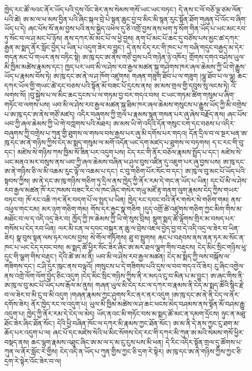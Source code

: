 \documentclass{article}
\begin{document}
ཁྱེད་རང་ཚོ་ལའང་ནོར་ཡོད་པའི་དུས་འོང་ཟེར་ནས་སེམས་གསོ་ཡང་ཡང་བཏང་། དེ་ནས་ང་ལོ་བཅོ་ལྔ་ཙམ་ལོན་པའི་ཚེ། ཨ་མ་ལ་ཕ་མས་བྱིན་པའི་ཞིང་སྐལ་བྲེ་པེ་སྟན་ཆུང་བྱ་བ་མིང་མི་སྙན་རུང་སྟོན་ཐོག་གཞུན་པོ་འོང་བ་ཞིག་ཡོད་པ་དེ། ཞང་པོས་སོ་ནམ་བྱས་པའི་ནས་སྐྱེད་འཕེལ་དུ་ཅི་འགྲོ་བྱས་ནས་ཕག་ཏུ་སོག་གིན་ཡོད་པ་ཡང་མང་རབ་ཏུ་སོང་བ་ལ་ཤ་མང་པོ་ཉོས། ནས་དཀར་མོ་མང་པོ་ལ་ཕྱེ་བྱས། ནག་པོ་མང་པོ་ཆང་དུ་བཙོས་པས་མྱང་ཚ་དཀར་རྒྱན་མ་སྨད་ནོར་སློང་བྱེད་པ་ཡིན་པ་འདུག་ཟེར་བ་བྱུང་། དེ་ནས་ངེད་རང་གི་ཁང་པ་ཀ་བཞི་གདུང་བརྒྱད་མ་དེར་གདན་མང་པོ་གཡར་ནས་བཏིང་སྟེ། ཨ་ཁུ་དང་ཨ་ནེས་གཙོ་བྱས་པའི་གཉེན་ཉེ་འཁོར། གྲོགས་དགའ་བཤེས་ཡུལ་མི་ཁྱིམ་མཚེས་རྣམས་དང་། ཁྱད་པར་ཡབ་མི་ལ་ཤེས་རབ་རྒྱལ་མཚན་སྐུ་གཤེགས་ཁར་ཞལ་ཆེམས་ཀྱི་ཡི་གེ་རྒྱུས་ཡོད་པ་རྣམས་བོས་ཏེ། ཨ་ཁུ་དང་ཨ་ནེ་ལ་ཤ་ཁོག་འཛུགས། གཞན་གཟུག་ཐོབ་པ་ལ་གཟུག །ལྷུ་ཐོབ་པ་ལ་ལྷུ། ཆང་དཀར་ཡོལ་གྱི་གཡང་ཚེ་དང་བཅས་པའི་སྟོན་མོ་བཟང་པོ་དྲངས་ནས། ཨ་མས་གྲལ་གྱི་དབུས་སུ་ལངས་ཏེ། འོ་ལགས་སོ། །བུ་སྐྱེས་པ་ལ་མིང་ཆང་དྲངས་པ་ལ་གཏམ་བྱ་བར་གདའ་བས། ང་ཡང་གཏམ་ཚིག་གསུམ་པ་ཞིག་གཏོང་བ་ལགས་པས། ཡབ་མི་ལ་ཤེས་རབ་རྒྱལ་མཚན་སྐུ་ཐིམ་ཁར་ཞལ་ཆེམས་གསུངས་པ་རྒྱུས་ཡོད་ཀྱི་མི་བགྲེས་པ་ཨ་ཁུ་དང་ཨ་ནེས་གཙོ་མཛད། འདིར་བཞུགས་ཀྱི་གྲལ་པ་རྣམས་སྙན་གསན་པར་ཞུ་ཞེས་བརྗོད་ནས། ཞང་པོས་ཡབ་ཀྱི་ཞལ་ཆེམས་ཀྱི་ཡེ་གེ་བཀླགས་པའི་མཐར། ཨ་མས་ཡི་གེ་འདིའི་དོན་གསུང་ངག་དང་བཅས་པ་འདིར་བཞུགས་ཀྱི་བགྲེས་པ་ཀུན་གྱི་ཐུགས་ལ་གསལ་བས་རྒྱས་པར་ཞུ་མི་དགོས་པར་གདའ། དོན་དྲིལ་བ་ལ་སྔར་ཕན་ཨ་ཁུ་དང་ཨ་ནེ་གཉིས་ཀྱིས་ངེད་མ་སྨད་གསུམ་ལ་མགོ་འདོན་ཡང་དག་མཛད་པ་ཐུགས་ལ་བཏགས། ད་ང་རང་གི་བུ་དང་། མཛེས་སེ་གཉིས་ཀས་ཁྱིམ་སོ་ཟིན་པར་འདུག་པས། ངེད་རང་གི་ནོར་བཅོལ་རྣམས་སྤྲོད་པ་དང་། མཛེས་སེ་ཡང་མནའ་མར་བསུས་ནས་ཡབ་ཀྱི་ཞལ་ཆེམས་བཞིན་ཕ་ཤུལ་བུས་འཛིན་དུ་འཇུག་པར་ཞུ་བྱས་པས། ཨ་ཁུ་དང་ཨ་ནེ་གཉིས་ཅི་ལ་མི་འཆམ་རུང་ལྟོ་ལ་འཆམ་པ་དང་། ང་བུ་གཅིག་པོར་སོང་བ་དང་། ཨ་ཁུ་ལ་བུ་མང་པོ་ཡོད་པའི་སྟབས་ཀྱིས། ཨ་ནེ་དང་ཨ་ཁུ་གཉིས་གཅིག་ཏུ་དྲིལ་ནས་ཁྱེད་ཀྱི་ནོར་རམ་དེ་གང་ན་ཡོད་པ་ཡིན། དང་པོ་མི་ལ་ཤེས་རབ་རྒྱལ་མཚན་ཁོ་རང་ཁམས་བཟང་རིང་ལ་ཁང་ཞིང་གསེར་གཡུ་མཛོ་རྟ་གནག་ལུག་རྣམས་ངེད་ཀྱིས་གཡར་བཏང་བ། ཁོ་རང་འཆི་ཀར་ནོར་བདག་པོ་ལ་སྤྲད་པ་ཡིན། ཁྱེད་རང་དབང་བའི་ནོར་གསེར་སེ་གཅིག་གམ། ནས་འཕུལ་གང་ངམ། མར་ཉག་གཅིག་གམ། གོས་དར་རྐྱང་སྣ་གཅིག །དུད་འགྲོ་ཚེ་འཛུགས་གཅིག་ཀྱང་མིག་གིས་མ་མཐོང་བ་ལ་ད་འདི་འདྲ་ཟེར་བ། ཁྱོད་ཀྱི་ཁ་ཆེམས་ཀྱི་ཡི་གེ་སུས་བྲིས། སྡུག་སྨད་ཚོ་ལྟོགས་གྲིར་མ་བསད་པར་གསོས་པ་ངེད་རབ་ཡིན། ལར་མི་ངན་ལ་དབང་བསྐུར་ན་ཆུ་ལ་བྲེས་འཇལ་བྱེད་བྱ་བ་དེ་འདི་འདྲ་ལ་ཟེར་བ་ཡིན་ཟེར། སྣ་བུས་སྟན་ལས་ཧར་ལངས་བྱས། སེ་གོལ་གཏོགས། ཐུ་བ་སྤྲུགས། རྐང་པ་བརྡབས་ནས་ནན་ཏར་མ་སོང་ན་ཁང་པ་ཡང་ངེད་དབང་བས། མ་སྨད་ཚོ་ཕྱིར་སོང་ཟེར་ཞིང་ཨ་མར་ཐལ་ལྕག་གིས་བརྡུངས། ངེད་མིང་སྲིང་གཉིས་ཕུ་དུང་གི་ལྕག་གིས་བརྡུང་། དེའི་ཚེ་ཨ་མ་ནི། ཡབ་མི་ལ་ཤེས་རབ་རྒྱལ་མཚན། ངེད་མ་སྨད་ཀྱི་ལས་བསྐོས་ལ་གཟིགས་དང་། ང་ཤི་དུར་ཁུང་ནས་བལྟའོ། །གསུངས་པ་དེ་གཟིགས་པའི་དུས་ལ་བབ་གདའ་འོ་ཟེར། ངུ་ཞིང་འགྱེལ་ནས་འགྲེ་ལོག་ལོག་བྱེད་ཅིང་འདུག །ངེད་མིང་སྲིང་གཉིས་ཀྱིས་ནི་ར་མདའ་ངུ་བ་མིན་པ་མ་བྱུང་། ཨ་ཞང་གིས་ནི་ཨ་ཁུ་ལ་བུ་མང་པོ་ཡོད་པས་རྒོལ་མ་ནུས། གཞན་ཡུལ་མི་ངེད་རང་ལ་དཀར་བ་རྣམས་ནི་ངེད་མ་སྨད་ཚོའི་སྙིང་རྗེ་བ་ལ་ཟེར་བ་མི་ངུ་བ་མི་འདུག །གཞན་རྣམས་ཀྱང་ཤུགས་རིང་ནར་ནར་འདུག །ཨ་ཁུ་དང་ཨ་ནེ་ནི་ངེད་ལ་ནོར་དགོས་ཟེར། ནོར་ཁྱེད་རང་ལ་འདུག་པ། ཡུལ་མི་ཁྱིམ་མཚེས་ལ་ཤ་ཆང་ཕངས་མེད་བཤམས་ནས་སྟོན་མོ་བཤམ་རྒྱུ་འདུག་པ། ཁྱེད་ཀྱི་ནོར་རམ་དེ་ངེད་ལ་མེད། ཡོད་ནའང་མི་གཏོང་བས་མ་སྨད་ཚོ་མང་ན་དམག་དྲོངས། ཉུང་ན་མཐུ་ཐོང་ཟེར་ཞིང་ཐོན་སོང་། དེའི་ཕྱི་བཞིན་ཁོང་ལ་དཀར་མི་རྣམས་ཀྱང་ཐོན་སོང་། ཨ་མ་ནི་དེ་ནས་ཀྱང་ངུ་ཐག་མ་ཆོད་པར་འདུག་པ་ལ། ཞང་པོ་དང་མཛེས་སེའི་ཕ་མིང་སོགས་ངེད་རང་གི་དཀར་མི་ཀུན་ཨ་མའི་སེམས་གསོ་ཕྱིར་བསྡད་ནས། ཆང་ལྷག་རྣམས་འཐུང་ཞིང་ཨ་མ་ལ་ད་མ་ངུ་ངུས་པས་མི་ཕན། དེ་རིང་འདིར་སྟོན་གྲལ་དུ་ཚོགས་པ་ཀུན་ལ་ནོར་སློང་རེ་གྱིས། ངེད་འདི་ན་ཡོད་པ་ཀུན་གྱིས་ཀྱང་ཅི་དྲག་རེ་སྟེར། ཨ་ཁུ་དང་ཨ་ནེ་གཉིས་ཀྱིས་ཀྱང་ཅི་དྲག་རེ་སྟེར་འོང་ཟེར་བ་ལ། 
\end{document}
